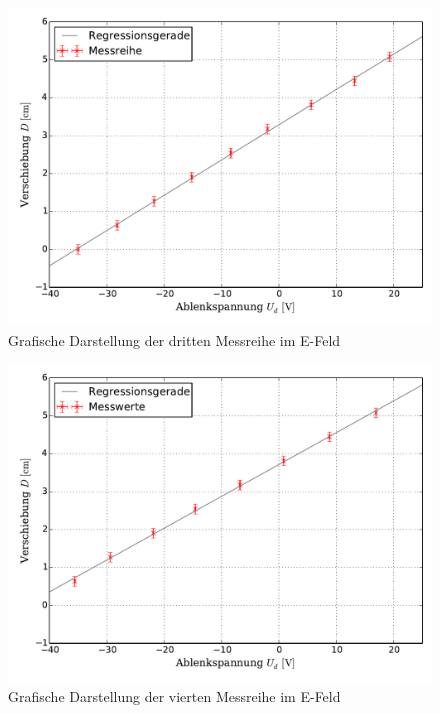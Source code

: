 		\begin{figure}[!h]
		\centering
				\includegraphics[scale=0.7]{Grafiken/EFeld_Messreihe_III.pdf}
				\caption{Grafische Darstellung der dritten Messreihe im E-Feld}\label{fig:Auswertung_Messdaten_I_III}
		\end{figure}
		
		\begin{figure}[!h]
		\centering
				\includegraphics[scale=0.7]{Grafiken/EFeld_Messreihe_IV.pdf}
				\caption{Grafische Darstellung der vierten Messreihe im E-Feld}\label{fig:Auswertung_Messdaten_I_IV}
		\end{figure}
		
